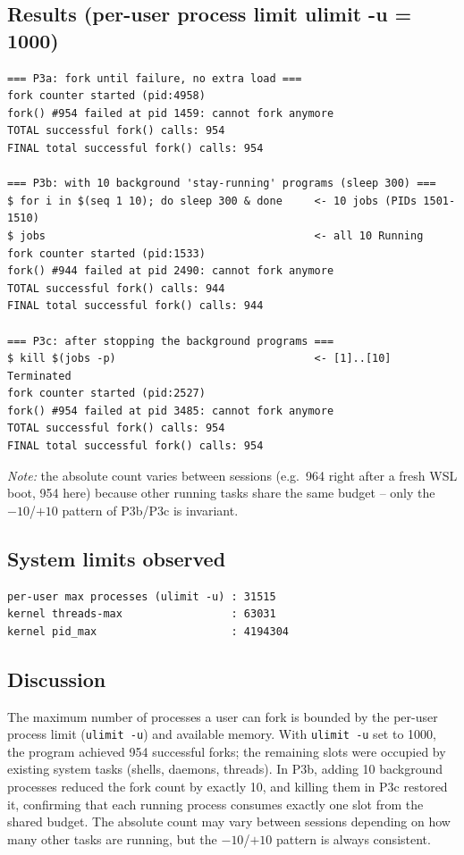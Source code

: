 \documentclass[11pt,a4paper]{article}
\begin{document}
\subsection*{Results (per-user process limit ulimit -u = 1000)}

\begin{lstlisting}[style=termstyle]
=== P3a: fork until failure, no extra load ===
fork counter started (pid:4958)
fork() #954 failed at pid 1459: cannot fork anymore
TOTAL successful fork() calls: 954
FINAL total successful fork() calls: 954

=== P3b: with 10 background 'stay-running' programs (sleep 300) ===
$ for i in $(seq 1 10); do sleep 300 & done     <- 10 jobs (PIDs 1501-1510)
$ jobs                                          <- all 10 Running
fork counter started (pid:1533)
fork() #944 failed at pid 2490: cannot fork anymore
TOTAL successful fork() calls: 944
FINAL total successful fork() calls: 944

=== P3c: after stopping the background programs ===
$ kill $(jobs -p)                               <- [1]..[10] Terminated
fork counter started (pid:2527)
fork() #954 failed at pid 3485: cannot fork anymore
TOTAL successful fork() calls: 954
FINAL total successful fork() calls: 954
\end{lstlisting}

\noindent\textit{Note:} the absolute count varies between sessions (e.g.\ 964 right after a fresh WSL boot, 954 here) because other running tasks share the same budget -- only the $-10$/$+10$ pattern of P3b/P3c is invariant.

\subsection*{System limits observed}

\begin{lstlisting}[style=termstyle]
per-user max processes (ulimit -u) : 31515
kernel threads-max                 : 63031
kernel pid_max                     : 4194304
\end{lstlisting}

\subsection*{Discussion}

The maximum number of processes a user can fork is bounded by the per-user process limit (\texttt{ulimit~-u}) and available memory. With \texttt{ulimit~-u} set to 1000, the program achieved 954 successful forks; the remaining slots were occupied by existing system tasks (shells, daemons, threads). In P3b, adding 10 background processes reduced the fork count by exactly 10, and killing them in P3c restored it, confirming that each running process consumes exactly one slot from the shared budget. The absolute count may vary between sessions depending on how many other tasks are running, but the $-10$/$+10$ pattern is always consistent.
\end{document}
